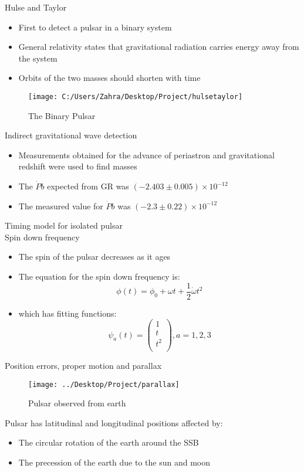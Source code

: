 \documentclass{beamer}
\begin{document}
\begin{frame}{Hulse and Taylor}
\begin{itemize}
\item First to detect a pulsar in a binary system
\item General relativity states that gravitational radiation carries energy away from the system 
\item Orbits of the two masses should shorten with time
\end{itemize}

\begin{figure}
	\texttt{[image: C:/Users/Zahra/Desktop/Project/hulsetaylor]}
	\caption{\label{fig:hulsetaylor.jpg}The Binary Pulsar}
\end{figure}

\end{frame}

\begin{frame}{Indirect gravitational wave detection}
\begin{itemize}
\item Measurements obtained for the advance of periastron and gravitational redshift were used to find masses 
\item The $\dot Pb$ expected from GR was ${(-2.403\pm 0.005)}\times 10^{-12}$
\item The measured value for $\dot Pb$ was ${(-2.3\pm 0.22)}\times 10^{-12}$
\end{itemize}
\end{frame}

\begin{frame}{Timing model for isolated pulsar\\Spin down frequency}
\begin{itemize}
\item The spin of the pulsar decreases as it ages
\item The equation for the spin down frequency is:
$$\phi(t)=\phi_0 +\omega t+\frac{1}{2}\dot{\omega} t^2$$ 
\item which has fitting functions:
$$
\psi_a(t)=
\begin{pmatrix}
1\\
t\\
t^2\\
\end{pmatrix}, a=1,2,3
$$
\end{itemize}
\end{frame}

\begin{frame}{Position errors, proper motion and parallax}

\begin{figure}
	\centering
	\texttt{[image: ../Desktop/Project/parallax]}
	\caption{Pulsar observed from earth}
	\label{fig:parallax}
\end{figure}
Pulsar has latitudinal and longitudinal positions affected by:
\begin{itemize}
\item The circular rotation of the earth around the SSB
\item The precession of the earth due to the sun and moon  
\end{itemize}
\end{frame}
\end{document}
